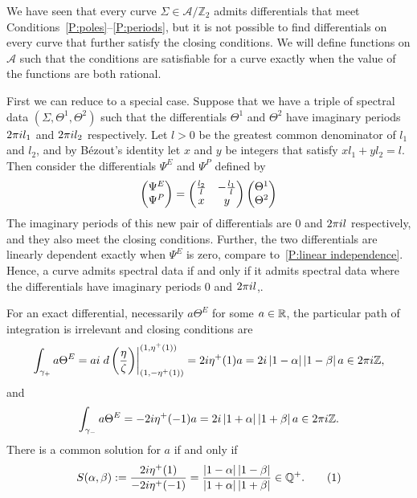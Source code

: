 \documentclass{article}
\begin{document}
We have seen that every curve $\Sigma\in\mathcal{A}/\mathbb{Z}_2$ admits differentials that meet Conditions~\ref{P:poles}--\ref{P:periods}, but it is not possible to find differentials on every curve that further satisfy the closing conditions. We will define functions on $\mathcal{A}$ such that the conditions are satisfiable for a curve exactly when the value of the functions are both rational.

First we can reduce to a special case. Suppose that we have a triple of spectral data $(\Sigma,\Theta^1,\Theta^2)$ such that the differentials $\Theta^1$ and $\Theta^2$ have imaginary periods $2\pi i l_1$ and $2\pi i l_2$ respectively. Let $l>0$ be the greatest common denominator of $l_1$ and $l_2$, and by B\'ezout's identity let $x$ and $y$ be integers that satisfy $xl_1 + yl_2 = l$. Then consider the differentials $\Psi^E$ and $\Psi^P$ defined by
\[
\begin{pmatrix} \Psi^E \\ \Psi^P \end{pmatrix} =
\begin{pmatrix}
\tfrac{l_2}{l}    &   -\tfrac{l_1}{l} \\
x                       &   y
\end{pmatrix}
\begin{pmatrix} \Theta^1 \\ \Theta^2 \end{pmatrix}
\]
The imaginary periods of this new pair of differentials are $0$ and $2\pi i l$ respectively, and they also meet the closing conditions. Further, the two differentials are linearly dependent exactly when $\Psi^E$ is zero, compare to~\ref{P:linear independence}. Hence, a curve admits spectral data if and only if it admits spectral data where the differentials have imaginary periods $0$ and $2\pi i l$,.

For an exact differential, necessarily $a\Theta^E$ for some $a\in\mathbb{R}$, the particular path of integration is irrelevant and closing conditions are
\[
\int_{\gamma_{+}} a\Theta^E = ai \left. d\left(\frac{\eta}{\zeta}\right) \right|_{(1, -\eta^+(1))}^{(1, \eta^+(1))} = 2i \eta^+(1)a = 2i \left|1-\alpha\right|\left|1-\beta\right|a \in 2\pi i \mathbb{Z},
\]
and 
\[
\int_{\gamma_{-}} a\Theta^E = -2i \eta^+(-1)a = 2i \left|1+\alpha\right|\left|1+\beta\right|a \in 2\pi i \mathbb{Z}.
\]
There is a common solution for $a$ if and only if
\[
S(\alpha,\beta) := \frac{2\iu \eta^+(1)}{-2\iu \eta^+(-1)} = \frac{\abs{1-\alpha}\abs{1-\beta}}{\abs{1+\alpha}\abs{1+\beta}} \in \Q^+.
\labelthis{eqn:def_S}
\]
\end{document}
